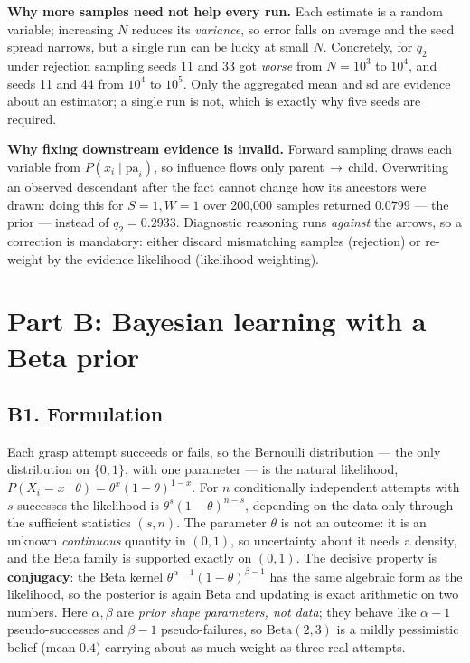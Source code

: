 \documentclass[10pt,a4paper]{article}
\begin{document}
\textbf{Why more samples need not help every run.} Each estimate is a random variable; increasing $N$
reduces its \emph{variance}, so error falls on average and the seed spread narrows, but a single run
can be lucky at small $N$. Concretely, for $q_2$ under rejection sampling seeds 11 and 33 got
\emph{worse} from $N{=}10^3$ to $10^4$, and seeds 11 and 44 from $10^4$ to $10^5$. Only the
aggregated mean and sd are evidence about an estimator; a single run is not, which is exactly why
five seeds are required.

\textbf{Why fixing downstream evidence is invalid.} Forward sampling draws each variable from
$P(x_i\mid\mathrm{pa}_i)$, so influence flows only parent$\,\to\,$child. Overwriting an observed
descendant after the fact cannot change how its ancestors were drawn: doing this for $S{=}1,W{=}1$
over 200{,}000 samples returned $0.0799$ --- the prior --- instead of $q_2=0.2933$. Diagnostic
reasoning runs \emph{against} the arrows, so a correction is mandatory: either discard mismatching
samples (rejection) or re-weight by the evidence likelihood (likelihood weighting).

\section{Part B: Bayesian learning with a Beta prior}

\subsection{B1. Formulation}

Each grasp attempt succeeds or fails, so the Bernoulli distribution --- the only distribution on
$\{0,1\}$, with one parameter --- is the natural likelihood,
$P(X_i{=}x\mid\theta)=\theta^x(1-\theta)^{1-x}$. For $n$ conditionally independent attempts with $s$
successes the likelihood is $\theta^s(1-\theta)^{n-s}$, depending on the data only through the
sufficient statistics $(s,n)$. The parameter $\theta$ is not an outcome: it is an unknown
\emph{continuous} quantity in $(0,1)$, so uncertainty about it needs a density, and the Beta family
is supported exactly on $(0,1)$. The decisive property is \textbf{conjugacy}: the Beta kernel
$\theta^{\alpha-1}(1-\theta)^{\beta-1}$ has the same algebraic form as the likelihood, so the
posterior is again Beta and updating is exact arithmetic on two numbers. Here $\alpha,\beta$ are
\emph{prior shape parameters, not data}; they behave like $\alpha{-}1$ pseudo-successes and
$\beta{-}1$ pseudo-failures, so $\mathrm{Beta}(2,3)$ is a mildly pessimistic belief (mean $0.4$)
carrying about as much weight as three real attempts.
\end{document}

